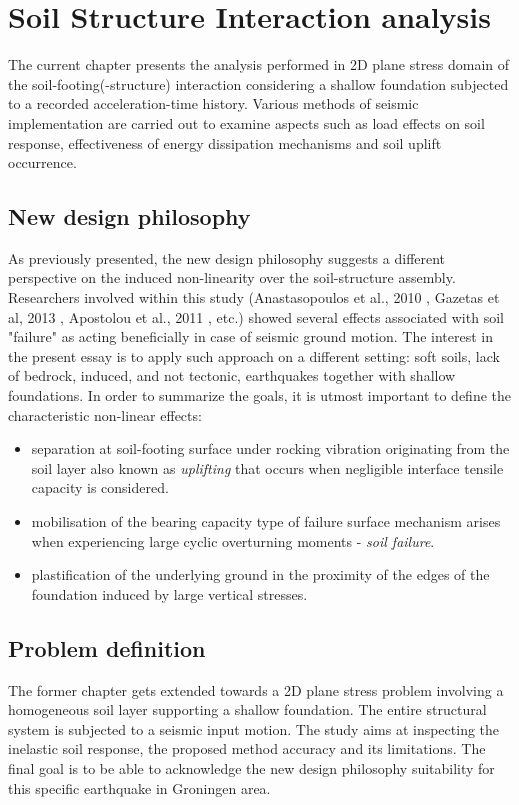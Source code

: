 	\chapter{Soil Structure Interaction analysis} \label{ch6}
	
	The current chapter presents the analysis performed in 2D plane stress domain of the soil-footing(-structure) interaction considering a shallow foundation subjected to a recorded acceleration-time history. Various methods of seismic implementation are carried out to examine aspects such as load effects on soil response, effectiveness of energy dissipation mechanisms and soil uplift occurrence.
	
	\section{New design philosophy}
	As previously presented, the new design philosophy suggests a different perspective on the induced non-linearity over the soil-structure assembly. Researchers involved within this study (Anastasopoulos et al., 2010 \cite{anastasopoulos2010soil}, Gazetas et al, 2013 \cite{gazetas2013nonlinear}, Apostolou et al., 2011 \cite{apostolou2011soil}, etc.) showed \mbox{several} effects associated with soil "failure" as acting beneficially in case of seismic ground motion. The interest in the present essay is to apply such approach on a different setting: soft soils, lack of bedrock, induced, and not tectonic, earthquakes together with shallow foundations. In order to summarize the goals, it is utmost important to define the characteristic non-linear effects:
	\begin{itemize}
		\item separation at soil-footing surface under rocking vibration originating from the soil layer also known as \textit{uplifting} that occurs when negligible interface tensile capacity is considered.
		\item mobilisation of the bearing capacity type of failure surface mechanism arises when experiencing large cyclic overturning moments - \textit{soil failure}.
		\item plastification of the underlying ground in the proximity of the edges of the foundation \mbox{induced} by large vertical stresses.
	\end{itemize} 
	
	\section{Problem definition}
	The former chapter gets extended towards a 2D plane stress problem involving a homogeneous soil layer supporting a shallow foundation. The entire structural system is subjected to a seismic input motion. The study aims at inspecting the inelastic soil response, the proposed method accuracy and its limitations. The final goal is to be able to acknowledge the new design philosophy suitability for this specific earthquake in Groningen area.
	
